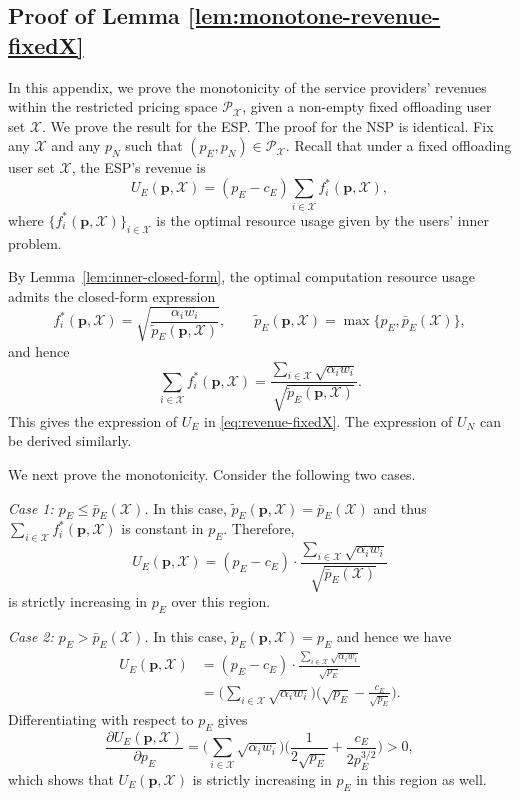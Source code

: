 \documentclass[lettersize,journal]{IEEEtran}
\begin{document}
\subsection{Proof of Lemma \ref{lem:monotone-revenue-fixedX}}\label{proof:monotone-revenue-fixedX}
In this appendix, we prove the monotonicity of the service providers' revenues within the restricted pricing space $\mathcal{P}_{\mathcal{X}}$, given a non-empty fixed offloading user set $\mathcal{X}$.
We prove the result for the ESP. The proof for the NSP is identical.
Fix any $\mathcal{X}$ and any $p_N$ such that $(p_E,p_N)\in\mathcal{P}_{\mathcal{X}}$.
Recall that under a fixed offloading user set $\mathcal{X}$, the ESP's revenue is
\[
U_E(\boldsymbol{p}, \mathcal{X})=(p_E-c_E)\sum_{i\in\mathcal{X}} f_i^*(\boldsymbol{p},\mathcal{X}),
\]
where $\{f_i^*(\boldsymbol{p},\mathcal{X})\}_{i\in\mathcal{X}}$ is the optimal resource usage given by the users' inner problem.

By Lemma~\ref{lem:inner-closed-form}, the optimal computation resource usage admits the closed-form expression
\[
f_i^*(\boldsymbol{p},\mathcal{X})
=\sqrt{\frac{\alpha_i w_i}{\tilde p_E(\boldsymbol{p},\mathcal{X})}},
\qquad
\tilde p_E(\boldsymbol{p},\mathcal{X})=\max\{p_E,\bar p_E(\mathcal{X})\},
\]
and hence
\[
\sum_{i\in\mathcal{X}} f_i^*(\boldsymbol{p},\mathcal{X})
=
\frac{\sum_{i\in\mathcal{X}}\sqrt{\alpha_i w_i}}{\sqrt{\tilde p_E(\boldsymbol{p},\mathcal{X})}}.
\]
This gives the expression of $U_E$ in \eqref{eq:revenue-fixedX}. The expression of $U_N$ can be derived similarly.

We next prove the monotonicity. Consider the following two cases.

\emph{Case 1: $p_E\le \bar p_E(\mathcal{X})$.}
In this case, $\tilde p_E(\boldsymbol{p},\mathcal{X})=\bar p_E(\mathcal{X})$ and thus
$\sum_{i\in\mathcal{X}} f_i^*(\boldsymbol{p},\mathcal{X})$ is constant in $p_E$.
Therefore,
\[
U_E(\boldsymbol{p}, \mathcal{X})
=(p_E-c_E)\cdot \frac{\sum_{i\in\mathcal{X}}\sqrt{\alpha_i w_i}}{\sqrt{\bar p_E(\mathcal{X})}}
\]
is strictly increasing in $p_E$ over this region.

\emph{Case 2: $p_E> \bar p_E(\mathcal{X})$.}
In this case, $\tilde p_E(\boldsymbol{p},\mathcal{X})=p_E$ and hence we have
\begin{equation*}
    \begin{split}
        U_E(\boldsymbol{p}, \mathcal{X})
&=(p_E-c_E)\cdot \frac{\sum_{i\in\mathcal{X}}\sqrt{\alpha_i w_i}}{\sqrt{p_E}}\\
&=\Big(\sum_{i\in\mathcal{X}}\sqrt{\alpha_i w_i}\Big)\Big(\sqrt{p_E}-\frac{c_E}{\sqrt{p_E}}\Big).
    \end{split}
\end{equation*}
Differentiating with respect to $p_E$ gives
\[
\frac{\partial U_E(\boldsymbol{p}, \mathcal{X})}{\partial p_E}
=
\Big(\sum_{i\in\mathcal{X}}\sqrt{\alpha_i w_i}\Big)
\Big(\frac{1}{2\sqrt{p_E}}+\frac{c_E}{2p_E^{3/2}}\Big)
>0,
\]
which shows that $U_E(\boldsymbol{p}, \mathcal{X})$ is strictly increasing in $p_E$ in this region as well.
\end{document}
